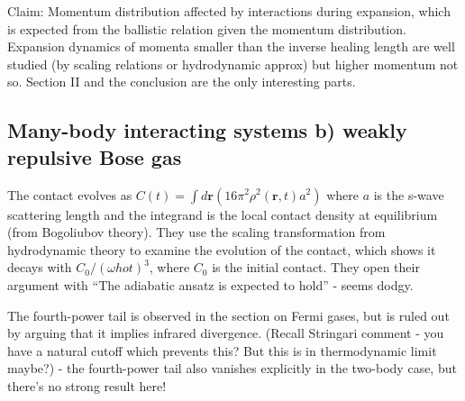 \documentclass{article}
\begin{document}
Claim: Momentum distribution affected by interactions during expansion, which is expected from the ballistic relation given the momentum distribution. Expansion dynamics of momenta smaller than the inverse healing length are well studied (by scaling relations or hydrodynamic approx) but higher momentum not so. Section II and the conclusion are the only interesting parts.

\subsection{Many-body interacting systems b) weakly repulsive Bose gas}

The contact evolves as $C(t) = \int d\textbf{r} (16\pi ^2 \rho^2(\textbf{r},t)a^2)$ where $a$ is the s-wave scattering length and the integrand is the local contact density at equilibrium (from Bogoliubov theory). They use the scaling transformation from hydrodynamic theory to examine the evolution of the contact, which shows it decays with $C_0 /(\omega{ho} t)^3$, where $C_0$ is the initial contact. They open their argument with ``The adiabatic ansatz is expected to hold'' - seems dodgy. 

The fourth-power tail is observed in the section on Fermi gases, but is ruled out by arguing that it implies infrared divergence. (Recall Stringari comment - you have a natural cutoff which prevents this? But this is in thermodynamic limit maybe?) - the fourth-power tail also vanishes explicitly in the two-body case, but there's no strong result here! 




\end{document}
